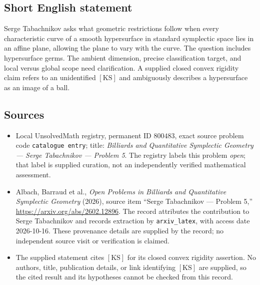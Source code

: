 \documentclass[11pt]{article}
\begin{document}
\subsection{Short English statement}
Serge Tabachnikov asks what geometric restrictions follow when every characteristic curve of a smooth hypersurface in standard symplectic space lies in an affine plane, allowing the plane to vary with the curve. The question includes hypersurface germs. The ambient dimension, precise classification target, and local versus global scope need clarification. A supplied closed convex rigidity claim refers to an unidentified \([\mathrm{KS}]\) and ambiguously describes a hypersurface as an image of a ball.
\subsection{Sources}
\begin{itemize}
\item Local UnsolvedMath registry, permanent ID \(800483\), exact source problem code \texttt{catalogue entry}; title: \emph{Billiards and Quantitative Symplectic Geometry --- Serge Tabachnikov --- Problem 5}. The registry labels this problem \emph{open}; that label is supplied curation, not an independently verified mathematical assessment.
\item Albach, Barraud et al., \emph{Open Problems in Billiards and Quantitative Symplectic Geometry} (2026), source item ``Serge Tabachnikov --- Problem 5,'' \url{https://arxiv.org/abs/2602.12896}. The record attributes the contribution to Serge Tabachnikov and records extraction by \texttt{arxiv\_latex}, with access date 2026-10-16. These provenance details are supplied by the record; no independent source visit or verification is claimed.
\item The supplied statement cites \([\mathrm{KS}]\) for its closed convex rigidity assertion. No authors, title, publication details, or link identifying \([\mathrm{KS}]\) are supplied, so the cited result and its hypotheses cannot be checked from this record.
\end{itemize}
\end{document}
